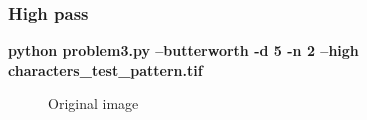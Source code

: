         \pagebreak
        \subsubsection{High pass}

        \small{\textbf{python problem3.py --butterworth -d 5 -n 2 --high characters\_test\_pattern.tif}}

        \begin{figure}[!htb]\centering
            \begin{minipage}{0.45\textwidth}
                \caption{\small{Original image}}
            \end{minipage}
            \begin{minipage}{0.45\textwidth}

\end{minipage}
\end{figure}
